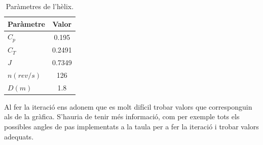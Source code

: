  \begin{table}[H]
	\centering
	\begin{tabular}{lc}
		\toprule[3pt]
		\textbf{Paràmetre}&\textbf{Valor}\\
		\midrule[1pt]
		$C_{p}$ & 0.195\\
		$C_{T}$ & 0.2491\\
		$J$ & 0.7349\\
		$n (rev/s)$ & 126\\
		$D (m)$ & 1.8\\
		\bottomrule[2pt]
	\end{tabular}
	\caption{Paràmetres de l'hèlix.}
\end{table}
\noindent Al fer la iteració ens adonem que es molt difícil trobar valors que corresponguin als de la gràfica. S'hauria de tenir més informació, com per exemple tots els possibles angles de pas implementats a la taula per a fer la iteració i trobar valors adequats. 
